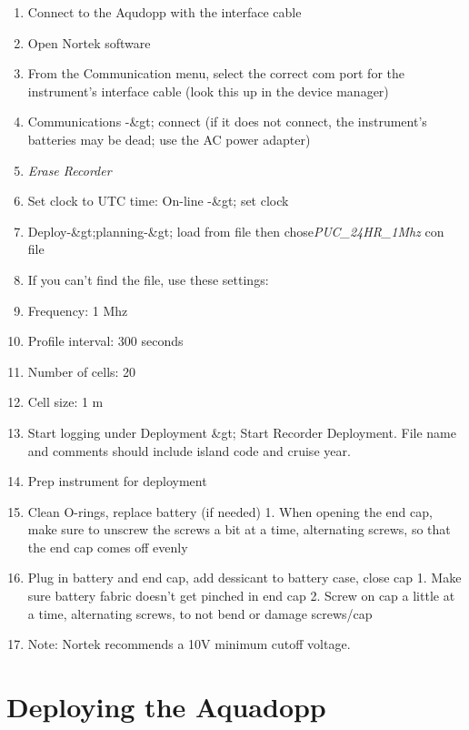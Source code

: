 \documentclass[]{book}
\providecommand{\tightlist}{%
  \setlength{\itemsep}{0pt}\setlength{\parskip}{0pt}}
\begin{document}
\begin{enumerate}
\def\labelenumi{\arabic{enumi}.}
\tightlist
\item
  Connect to the Aqudopp with the interface cable
\item
  Open Nortek software
\item
  From the Communication menu, select the correct com port for the instrument's interface cable (look this up in the device manager)
\item
  Communications -\&gt; connect (if it does not connect, the instrument's batteries may be dead; use the AC power adapter)
\item
  \emph{Erase Recorder}
\item
  Set clock to UTC time: On-line -\&gt; set clock
\item
  Deploy-\&gt;planning-\&gt; load from file then chose\emph{PUC\_24HR\_1Mhz} con file
\item
  If you can't find the file, use these settings:
\item
  Frequency: 1 Mhz
\item
  Profile interval: 300 seconds
\item
  Number of cells: 20
\item
  Cell size: 1 m
\item
  Start logging under Deployment \&gt; Start Recorder Deployment. File name and comments should include island code and cruise year.
\item
  Prep instrument for deployment
\item
  Clean O-rings, replace battery (if needed)
  1. When opening the end cap, make sure to unscrew the screws a bit at a time, alternating screws, so that the end cap comes off evenly
\item
  Plug in battery and end cap, add dessicant to battery case, close cap
  1. Make sure battery fabric doesn't get pinched in end cap
  2. Screw on cap a little at a time, alternating screws, to not bend or damage screws/cap
\item
  Note: Nortek recommends a 10V minimum cutoff voltage.
\end{enumerate}

\hypertarget{deploying-the-aquadopp}{%
\section{Deploying the Aquadopp}\label{deploying-the-aquadopp}}
\end{document}
